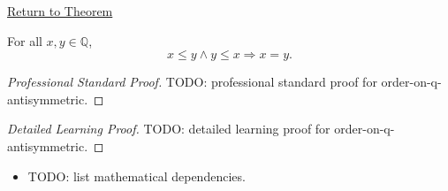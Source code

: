 \newpage
{}
\label{prf:order-on-q-antisymmetric}

\begin{remark*}[Return]
\hyperref[thm:order-on-q-antisymmetric]{Return to Theorem}
\end{remark*}

\begin{theorem*}
For all $x,y\in\mathbb{Q}$,
\[
x\le y\land y\le x \Longrightarrow x=y.
\]
\end{theorem*}

\begin{proof}[Professional Standard Proof]
\LRAProofBodyStart
TODO: professional standard proof for order-on-q-antisymmetric.
\end{proof}

\begin{proof}[Detailed Learning Proof]
\LRAProofBodyStart
TODO: detailed learning proof for order-on-q-antisymmetric.
\end{proof}

\begin{remark*}
\end{remark*}

\begin{dependencies}
\begin{itemize}
  \item TODO: list mathematical dependencies.
\end{itemize}
\end{dependencies}

\clearpage
